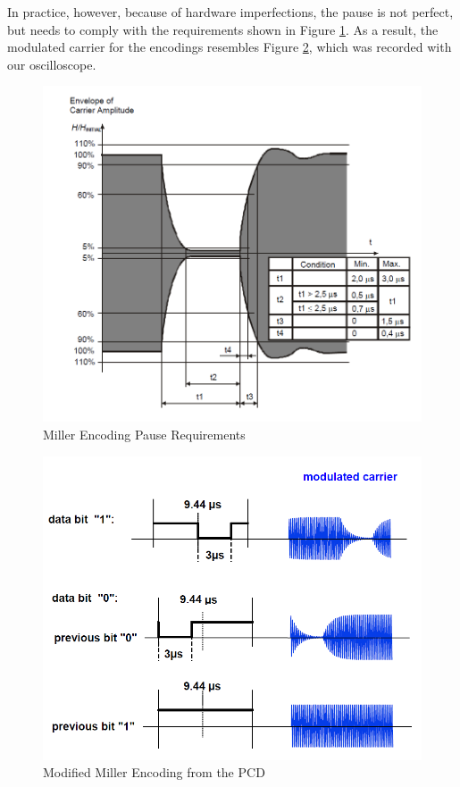 \documentclass[fleqn,10pt]{SelfArx} %
\begin{document}
In practice, however, because of hardware imperfections, the pause is not perfect, but needs to comply with the requirements shown in Figure \ref{fig:pause}. As a result, the modulated carrier for the encodings resembles Figure \ref{fig:miller2}, which was recorded with our oscilloscope.

\begin{figure}[tp]
  \includegraphics[width=\linewidth]{img/pause}
  \caption{Miller Encoding Pause Requirements \cite{iso144432}}
  \label{fig:pause}
\end{figure}


\begin{figure}[tp]
  \includegraphics[width=\linewidth]{img/miller2}
  \caption{Modified Miller Encoding from the PCD}
  \label{fig:miller2}
\end{figure}
\end{document}
